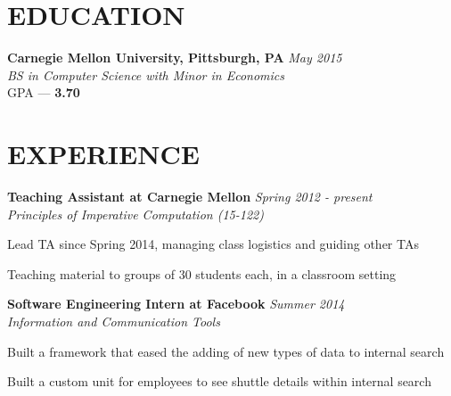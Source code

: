 \documentclass[margin, 11pt]{res} %
\begin{document}
\begin{resume}


\section{EDUCATION}

{\bf Carnegie Mellon University, Pittsburgh, PA} \hfill {\sl May 2015}\\
{\sl BS in Computer Science with Minor in Economics } \\
{\small GPA --- \textbf{3.70}}



\section{EXPERIENCE}

{\bf Teaching Assistant at Carnegie Mellon} \hfill {\sl Spring 2012 - present}\\
{\sl Principles of Imperative Computation (15-122)}

\begin{itemize} \itemsep -2pt
{\small \item Lead TA since Spring 2014, managing class logistics and guiding other TAs
\item Teaching material to groups of 30 students each, in a classroom setting}
\end{itemize}

\vspace{3pt}

{\bf Software Engineering Intern at Facebook} \hfill {\sl Summer 2014}\\
{\sl Information and Communication Tools}

\begin{itemize} \itemsep -2pt
{\small
\item Built a framework that eased the adding of new types of data to internal search
\item Built a custom unit for employees to see shuttle details within internal search
}
\end{itemize}



\end{resume}
\end{document}
